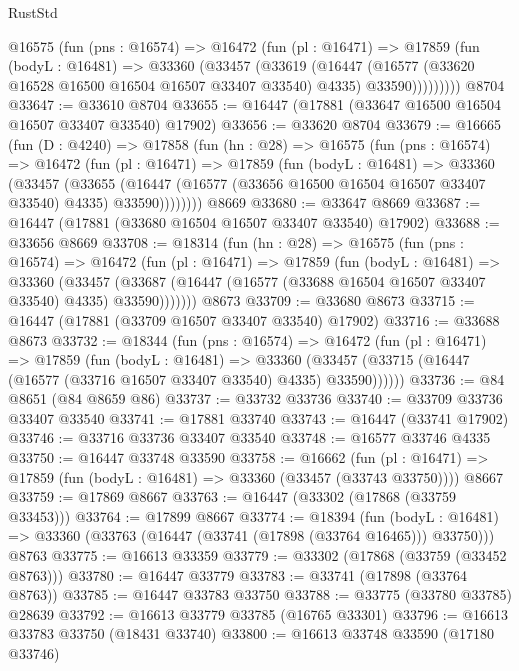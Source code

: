 \begin{lexlean}{RustStd}
\begin{coremodule}
        @16575
          (fun (pns : @16574) =>
          @16472
            (fun (pl : @16471) =>
            @17859
              (fun (bodyL : @16481) =>
              @33360
                (@33457
                  (@33619
                    (@16447
                      (@16577 (@33620 @16528 @16500 @16504 @16507 @33407 @33540) @4335)
                      @33590)))))))))
    @8704
@33647 := @33610 @8704
@33655 := @16447 (@17881 (@33647 @16500 @16504 @16507 @33407 @33540) @17902)
@33656 := @33620 @8704
@33679 := @16665
    (fun (D : @4240) =>
    @17858
      (fun (hn : @28) =>
      @16575
        (fun (pns : @16574) =>
        @16472
          (fun (pl : @16471) =>
          @17859
            (fun (bodyL : @16481) =>
            @33360
              (@33457
                (@33655
                  (@16447 (@16577 (@33656 @16500 @16504 @16507 @33407 @33540) @4335) @33590))))))))
    @8669
@33680 := @33647 @8669
@33687 := @16447 (@17881 (@33680 @16504 @16507 @33407 @33540) @17902)
@33688 := @33656 @8669
@33708 := @18314
    (fun (hn : @28) =>
    @16575
      (fun (pns : @16574) =>
      @16472
        (fun (pl : @16471) =>
        @17859
          (fun (bodyL : @16481) =>
          @33360
            (@33457
              (@33687 (@16447 (@16577 (@33688 @16504 @16507 @33407 @33540) @4335) @33590)))))))
    @8673
@33709 := @33680 @8673
@33715 := @16447 (@17881 (@33709 @16507 @33407 @33540) @17902)
@33716 := @33688 @8673
@33732 := @18344
    (fun (pns : @16574) =>
    @16472
      (fun (pl : @16471) =>
      @17859
        (fun (bodyL : @16481) =>
        @33360 (@33457 (@33715 (@16447 (@16577 (@33716 @16507 @33407 @33540) @4335) @33590))))))
@33736 := @84 @8651 (@84 @8659 @86)
@33737 := @33732 @33736
@33740 := @33709 @33736 @33407 @33540
@33741 := @17881 @33740
@33743 := @16447 (@33741 @17902)
@33746 := @33716 @33736 @33407 @33540
@33748 := @16577 @33746 @4335
@33750 := @16447 @33748 @33590
@33758 := @16662
    (fun (pl : @16471) => @17859 (fun (bodyL : @16481) => @33360 (@33457 (@33743 @33750))))
    @8667
@33759 := @17869 @8667
@33763 := @16447 (@33302 (@17868 (@33759 @33453)))
@33764 := @17899 @8667
@33774 := @18394
    (fun (bodyL : @16481) => @33360 (@33763 (@16447 (@33741 (@17898 (@33764 @16465))) @33750)))
    @8763
@33775 := @16613 @33359
@33779 := @33302 (@17868 (@33759 (@33452 @8763)))
@33780 := @16447 @33779
@33783 := @33741 (@17898 (@33764 @8763))
@33785 := @16447 @33783 @33750
@33788 := @33775 (@33780 @33785) @28639
@33792 := @16613 @33779 @33785 (@16765 @33301)
@33796 := @16613 @33783 @33750 (@18431 @33740)
@33800 := @16613 @33748 @33590 (@17180 @33746)

\end{coremodule}
\end{lexlean}
